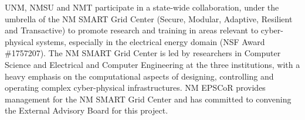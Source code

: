 UNM, NMSU and NMT participate in a state-wide collaboration, under the umbrella of the NM SMART Grid Center (Secure, Modular, Adaptive, Resilient and Transactive) to promote research and training in areas relevant to cyber-physical systems, especially in the electrical energy domain (NSF Award \#1757207). The NM SMART Grid Center is led by researchers in Computer Science and Electrical and Computer Engineering at the three institutions, with a heavy emphasis on the computational aspects of designing, controlling and operating complex cyber-physical infrastructures. NM EPSCoR provides management for the NM SMART Grid Center and has committed to convening the External Advisory Board for this project.
